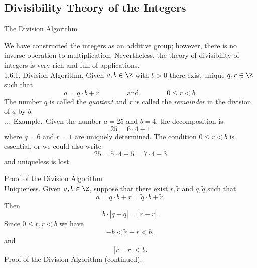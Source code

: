 \documentclass[smaller,hyperref={CJKbookmarks=true}]{beamer}
\newcounter{zhuo}[subsection]
\renewcommand{\thezhuo}{\thesection.\thesubsection.\arabic{zhuo}}
\newenvironment{EXAMPLE}{\stepcounter{zhuo}\alert{\!\thezhuo.~Example.\,}}{}
\begin{document}
\subsection{Divisibility Theory of the Integers}
\begin{frame}[c] \begin{spacing}{2}
\tableofcontents[sectionstyle=hide,subsectionstyle=show/shaded/hide]
\end{spacing}
\end{frame}
\begin{frame}{The Division Algorithm}
\begin{spacing}{0.85}
We have constructed the integers as an additive group; however, there is
no inverse operation to multiplication. Nevertheless, the theory of
divisibility of integers is very rich and full of applications.\\[5pt]
\alert{1.6.1. Division Algorithm.} Given $a,b\in\Z$ with $b>0$ there exist unique $q,r\in\Z$ such that
\setcounter{equation}{0}
\begin{equation}\label{1.6.1}
a=q\cdot b+r\qquad\qquad\text{and}\qquad
\qquad0\leq r<b.
\end{equation}
The number $q$ is called the \emph{quotient} and $r$ is called the \emph{remainder} in the division of $a$ by $b$.\\[5pt]
\setcounter{zhuo}{1}
\begin{EXAMPLE}
Given the number $a=25$ and $b=4$, the decomposition is
\[25=6\cdot4+1\]
where $q=6$ and $r=1$ are uniquely determined. The condition $0\leq r<b$ is essential, or we could also write
\[25=5\cdot4+5=7\cdot4-3\]
and uniqueless is lost.
\end{EXAMPLE}
\end{spacing}
\newpage
\begin{spacing}{1.15}
\alert{Proof of the Division Algorithm.}\\
\alert{Uniqueness.} Given $a,b\in\Z$, suppose that there exist $r,\widetilde{r}$ and $q,\widetilde{q}$ such that
\[a=q\cdot b+r=\widetilde{q}\cdot b+\widetilde{r}.\]
Then
\begin{equation}\label{1.6.2}
b\cdot|q-\widetilde{q}|=|\widetilde{r}-r|.
\end{equation}
Since $0\leq r,\widetilde{r}<b$ we have
\[-b<\widetilde{r}-r<b,\]
and
\begin{equation}\label{1.6.3}
|\widetilde{r}-r|<b.
\end{equation}
\newpage
\alert{Proof of the Division Algorithm (continued).}\\

\end{spacing}
\end{frame}
\end{document}
